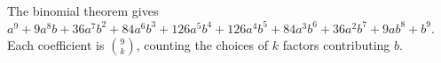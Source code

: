 The binomial theorem gives $\boxed{a^9+9a^8b+36a^7b^2+84a^6b^3+126a^5b^4+126a^4b^5+84a^3b^6+36a^2b^7+9ab^8+b^9}$. Each coefficient is $\binom9k$, counting the choices of $k$ factors contributing $b$.

